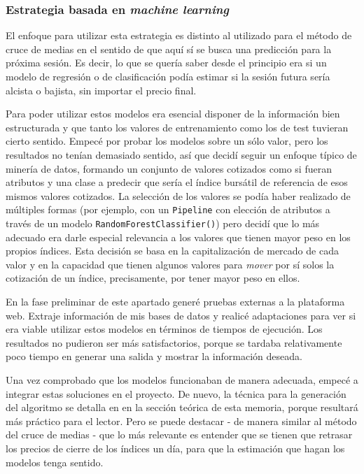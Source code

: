 \subsubsection{Estrategia basada en \emph{machine learning}}

El enfoque para utilizar esta estrategia es distinto al utilizado para el método de cruce de medias en el sentido de que aquí sí se busca una predicción para la próxima sesión. Es decir, lo que se quería saber desde el principio era si un modelo de regresión o de clasificación podía estimar si la sesión futura sería alcista o bajista, sin importar el precio final. 

Para poder utilizar estos modelos era esencial disponer de la información bien estructurada y que tanto los valores de entrenamiento como los de test tuvieran cierto sentido. Empecé por probar los modelos sobre un sólo valor, pero los resultados no tenían demasiado sentido, así que decidí seguir un enfoque típico de minería de datos, formando un conjunto de valores cotizados como si fueran atributos y una clase a predecir que sería el índice bursátil de referencia de esos mismos valores cotizados. La selección de los valores se podía haber realizado de múltiples formas (por ejemplo, con un \texttt{Pipeline} con elección de atributos a través de un modelo \texttt{RandomForestClassifier()}) pero decidí que lo más adecuado era darle especial relevancia a los valores que tienen mayor peso en los propios índices. Esta decisión se basa en la capitalización de mercado de cada valor y en la capacidad que tienen algunos valores para \emph{mover} por sí solos la cotización de un índice, precisamente, por tener mayor peso en ellos.

En la fase preliminar de este apartado generé pruebas externas a la plataforma web. Extraje información de mis bases de datos y realicé adaptaciones para ver si era viable utilizar estos modelos en términos de tiempos de ejecución. Los resultados no pudieron ser más satisfactorios, porque se tardaba relativamente poco tiempo en generar una salida y mostrar la información deseada. 

Una vez comprobado que los modelos funcionaban de manera adecuada, empecé a integrar estas soluciones en el proyecto. De nuevo, la técnica para la generación del algoritmo se detalla en en la sección teórica de esta memoria, porque resultará más práctico para el lector. Pero se puede destacar - de manera similar al método del cruce de medias - que lo más relevante es entender que se tienen que retrasar los precios de cierre de los índices un día, para que la estimación que hagan los modelos tenga sentido. 

